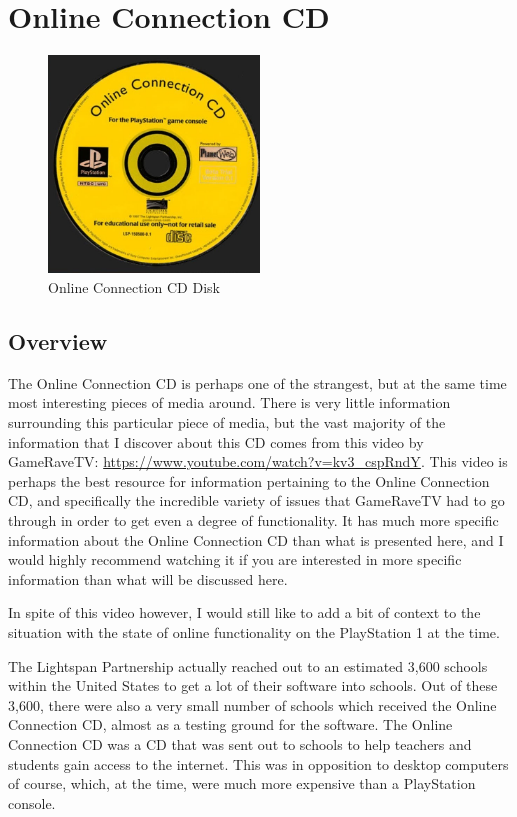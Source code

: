 \chapter{Online Connection CD}

\begin{figure}[H]
    \centering
    \includegraphics[width=0.5\textwidth]{./Games/OnlineConnectionCD/Images/OnlineConnectionCDDisk.png}
    \caption{Online Connection CD Disk}
\end{figure}

\section{Overview}

The Online Connection CD is perhaps one of the strangest, but at the same time most interesting pieces of media around.
There is very little information surrounding this particular piece of media, but the vast majority of the information that I discover about this CD comes from this video by GameRaveTV: \url{https://www.youtube.com/watch?v=kv3_cspRndY}.
This video is perhaps the best resource for information pertaining to the Online Connection CD, and specifically the incredible variety of issues that GameRaveTV had to go through in order to get even a degree of functionality.
It has much more specific information about the Online Connection CD than what is presented here, and I would highly recommend watching it if you are interested in more specific information than what will be discussed here.

In spite of this video however, I would still like to add a bit of context to the situation with the state of online functionality on the PlayStation 1 at the time.

The Lightspan Partnership actually reached out to an estimated 3,600 schools within the United States to get a lot of their software into schools.
Out of these 3,600, there were also a very small number of schools which received the Online Connection CD, almost as a testing ground for the software.
The Online Connection CD was a CD that was sent out to schools to help teachers and students gain access to the internet.
This was in opposition to desktop computers of course, which, at the time, were much more expensive than a PlayStation console.

